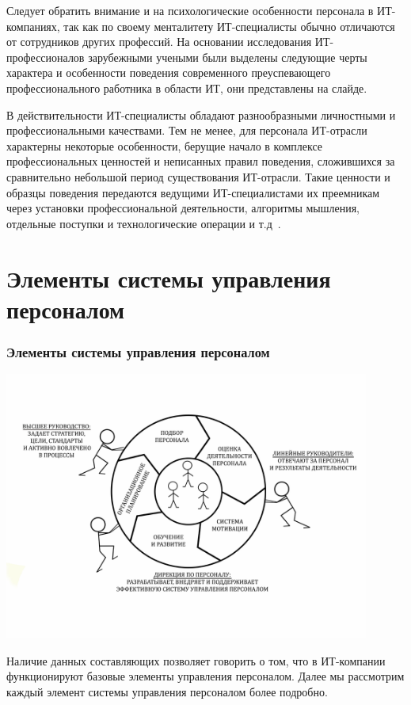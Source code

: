 \documentclass{../industrial-development}
\begin{document}
Следует обратить внимание и на психологические особенности персонала в ИТ-компаниях, так как по своему менталитету ИТ-специалисты обычно отличаются от сотрудников других профессий. На основании исследования ИТ-профессионалов зарубежными учеными были выделены следующие черты характера и особенности поведения современного преуспевающего профессионального работника в области ИТ, они представлены на слайде.

В действительности ИТ-специалисты обладают разнообразными личностными и профессиональными качествами. Тем не менее, для персонала ИТ-отрасли характерны некоторые особенности, берущие начало в комплексе профессиональных ценностей и неписанных правил поведения, сложившихся за сравнительно небольшой период существования ИТ-отрасли. Такие ценности и образцы поведения передаются ведущими ИТ-специалистами их преемникам через установки профессиональной деятельности, алгоритмы мышления, отдельные поступки и технологические операции и т.д~\cite{OsobenPoveden}. 

\section{Элементы системы управления персоналом}
\begin{frame} \frametitle{Элементы системы управления персоналом}
  
	\centerline{\includegraphics[width=0.9\textwidth]{socpic1.pdf}}
	
\end{frame}

\lecturenotes

Наличие данных составляющих позволяет говорить о том, что в ИТ-компании функционируют базовые элементы управления персоналом. Далее мы рассмотрим каждый элемент системы управления персоналом более подробно.
\end{document}
